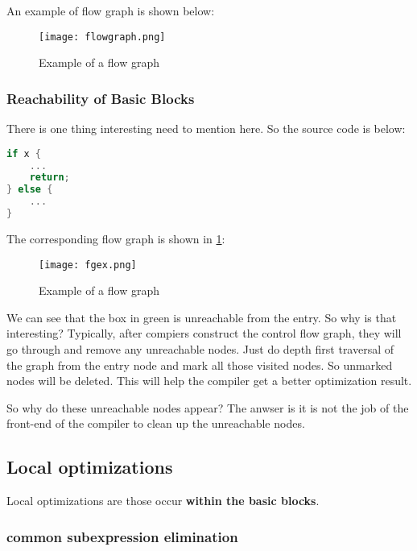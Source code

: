 An example of flow graph is shown below:

\begin{figure}[h]
    \centering
    \texttt{[image: flowgraph.png]}
    \caption{Example of a flow graph}
\end{figure}

\subsubsection{Reachability of Basic Blocks}

There is one thing interesting need to mention here. So the source code is below:

\begin{lstlisting}[language=C,frame=single, caption=An example]
if x { 
    ...
    return;
} else {
    ...
}


\end{lstlisting}


The corresponding flow graph is shown in \ref{fig:fgex}:

\begin{figure}[h]
    \centering
    \texttt{[image: fgex.png]}
    \caption{Example of a flow graph}
    \label{fig:fgex}
\end{figure}


We can see that the box in green is unreachable from the entry. So why is that interesting? Typically, after compiers 
construct the control flow graph, they will go through and remove any unreachable nodes. Just do depth first traversal of the graph
from the entry node and mark all those visited nodes. So unmarked nodes will be deleted. This will help the compiler get a better optimization
result.


So why do these unreachable nodes appear? The anwser is it is not the job of the front-end of the compiler to clean up the unreachable nodes. 



\subsection{Local optimizations}

Local optimizations are those occur \textbf{within the basic blocks}. 


\subsubsection{common subexpression elimination}

